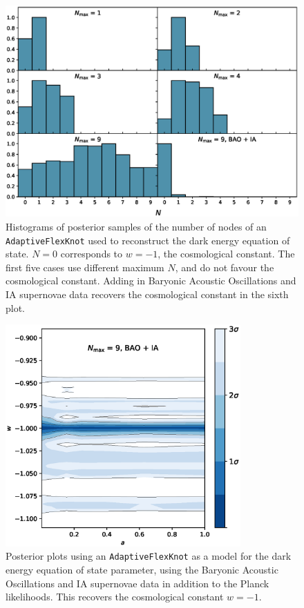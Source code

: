 \documentclass{article}
\begin{document}
\newpage

\begin{figure}[H]
  \centering
  \includegraphics[width=13cm]{darkN.eps}
  \caption{Histograms of posterior samples of the number of nodes of an \texttt{AdaptiveFlexKnot} used to reconstruct the dark energy equation of state. $N=0$ corresponds to $w=-1$, the cosmological constant. The first five cases use different maximum $N$, and do not favour the cosmological constant. Adding in Baryonic Acoustic Oscillations and IA supernovae data recovers the cosmological constant in the sixth plot.}
  \label{fig:darkN}
\end{figure}

\begin{figure}[H]
  \centering
  \includegraphics[width=9cm]{darkNbao.eps}
  \caption{Posterior plots using an \texttt{AdaptiveFlexKnot} as a model for the dark energy equation of state parameter, using the Baryonic Acoustic Oscillations and IA supernovae data in addition to the Planck likelihoods. This recovers the cosmological constant $w=-1$.}
  \label{fig:darkNbao}
\end{figure}
\end{document}
